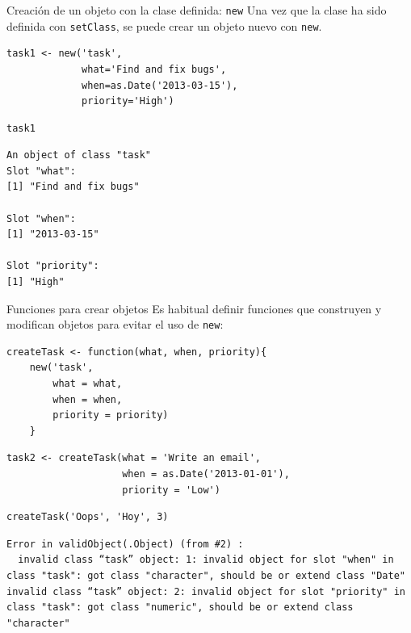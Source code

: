 \documentclass[xcolor={usenames,svgnames,dvipsnames}]{beamer}
\begin{document}
\begin{frame}[fragile,label={sec:orgheadline23}]{Creación de un objeto con la clase definida: \texttt{new}}
 Una vez que la clase ha sido definida con \texttt{setClass}, se puede crear un objeto nuevo con \texttt{new}.
\lstset{language=R,label= ,caption= ,captionpos=b,numbers=none}
\begin{lstlisting}
task1 <- new('task',
             what='Find and fix bugs',
             when=as.Date('2013-03-15'),
             priority='High')
\end{lstlisting}

\lstset{language=R,label= ,caption= ,captionpos=b,numbers=none}
\begin{lstlisting}
task1
\end{lstlisting}

\begin{verbatim}
An object of class "task"
Slot "what":
[1] "Find and fix bugs"

Slot "when":
[1] "2013-03-15"

Slot "priority":
[1] "High"
\end{verbatim}
\end{frame}

\begin{frame}[fragile,label={sec:orgheadline24}]{Funciones para crear objetos}
 Es habitual definir funciones que construyen y modifican objetos
para evitar el uso de \texttt{new}:
\lstset{language=R,label= ,caption= ,captionpos=b,numbers=none}
\begin{lstlisting}
createTask <- function(what, when, priority){
    new('task',
        what = what,
        when = when,
        priority = priority)
    }
\end{lstlisting}

\lstset{language=R,label= ,caption= ,captionpos=b,numbers=none}
\begin{lstlisting}
task2 <- createTask(what = 'Write an email',
                    when = as.Date('2013-01-01'),
                    priority = 'Low')
\end{lstlisting}

\lstset{language=R,label= ,caption= ,captionpos=b,numbers=none}
\begin{lstlisting}
createTask('Oops', 'Hoy', 3)
\end{lstlisting}

\begin{verbatim}
Error in validObject(.Object) (from #2) : 
  invalid class “task” object: 1: invalid object for slot "when" in class "task": got class "character", should be or extend class "Date"
invalid class “task” object: 2: invalid object for slot "priority" in class "task": got class "numeric", should be or extend class "character"
\end{verbatim}
\end{frame}
\end{document}
